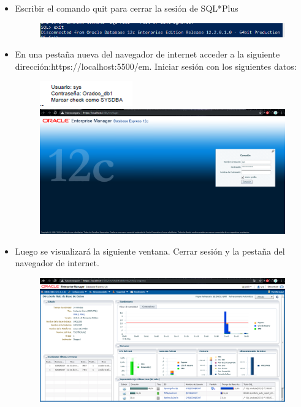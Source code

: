 \begin{itemize}
\begin{figure}[H]
\begin{center}
		\end{center}
		\end{figure}
	\item Escribir el comando quit para cerrar la sesión de SQL*Plus
		\begin{figure}[H]
		\begin{center}
		\includegraphics[width=15cm]{./Imagenes/10}
		\end{center}
		\end{figure}
	\item En una pestaña nueva del navegador de internet acceder a la siguiente dirección:https://localhost:5500/em. Iniciar sesión con los siguientes datos:
		\begin{figure}[H]
		\begin{center}
		\includegraphics[width=4cm]{./Imagenes/t1}
		\includegraphics[width=15cm]{./Imagenes/11}
		\end{center}
		\end{figure}
	\item Luego se visualizará la siguiente ventana. Cerrar sesión y la pestaña del navegador de internet.
		\begin{figure}[H]
		\begin{center}
		\includegraphics[width=15cm]{./Imagenes/12}

\end{center}
\end{figure}
\end{itemize}
